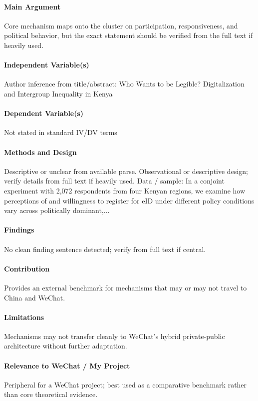 \documentclass[12pt]{article}
\begin{document}
\paragraph{Main Argument} Core mechanism maps onto the cluster on participation, responsiveness, and political behavior, but the exact statement should be verified from the full text if heavily used.

\paragraph{Independent Variable(s)} Author inference from title/abstract: Who Wants to be Legible? Digitalization and Intergroup Inequality in Kenya

\paragraph{Dependent Variable(s)} Not stated in standard IV/DV terms

\paragraph{Methods and Design} Descriptive or unclear from available parse. Observational or descriptive design; verify details from full text if heavily used. Data / sample: In a conjoint experiment with 2,072 respondents from four Kenyan regions, we examine how perceptions of and willingness to register for eID under different policy conditions vary across politically dominant,...

\paragraph{Findings} No clean finding sentence detected; verify from full text if central.

\paragraph{Contribution} Provides an external benchmark for mechanisms that may or may not travel to China and WeChat.

\paragraph{Limitations} Mechanisms may not transfer cleanly to WeChat's hybrid private-public architecture without further adaptation.

\paragraph{Relevance to WeChat / My Project} Peripheral for a WeChat project; best used as a comparative benchmark rather than core theoretical evidence.
\end{document}
